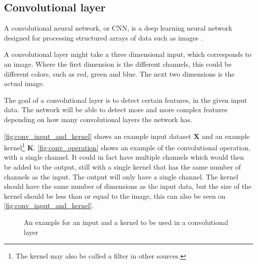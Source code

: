 \subsection{Convolutional layer}%
\label{sub:nn_conv}

\guillemotleft A convolutional neural network, or CNN, is a deep learning neural network designed for processing structured arrays of data such as images \guillemotright \cite{conv_article}.

A convolutional layer might take a three dimensional input, which corresponds to an image. Where the first dimension is the different channels, this could be different colors, such as red, green and blue. The next two dimensions is the actual image.

The goal of a convolutional layer is to detect certain features, in the given input data. The network will be able to detect more and more complex features depending on how many convolutional layers the network has.

\autoref{fig:conv_input_and_kernel} shows an example input dataset $\bm{X}$ and an example kernel\footnote{The kernel may also be called a filter in other sources.} $\bm{K}$.
\autoref{fig:conv_operation} shows an example of the convolutional operation, with a single channel. It could in fact have multiple channels which would then be added to the output, still with a single kernel that has the same number of channels as the input. The output will only have a single channel.
The kernel should have the same number of dimensions as the input data, but the size of the kernel should be less than or equal to the image, this can also be seen on \autoref{fig:conv_input_and_kernel}.

\begin{figure}
    \centering
    \hfill
    \hfill
    \hfill
    \null
    \caption{An example for an input and a kernel to be used in a convolutional layer}
    \label{fig:conv_input_and_kernel}
\end{figure}


